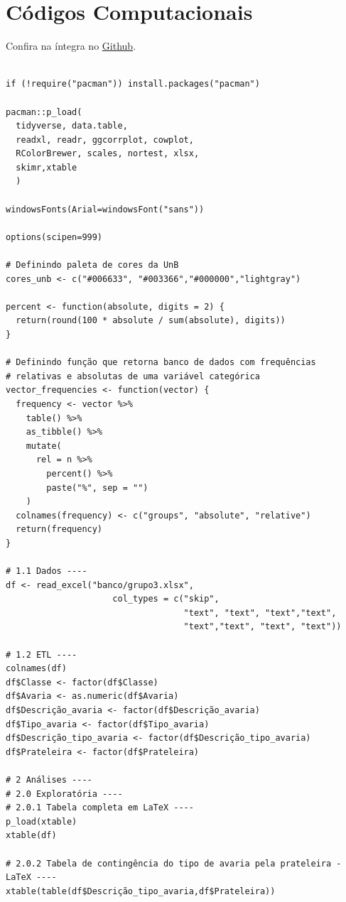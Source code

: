 \documentclass[a4paper, 12pt]{article}
\begin{document}
\newpage

\section{Códigos Computacionais}

Confira na íntegra no \href{https://github.com/penasta/Amostragem/blob/main/scripts/analises.R}{Github}.


\begin{lstlisting}

if (!require("pacman")) install.packages("pacman")

pacman::p_load(
  tidyverse, data.table,
  readxl, readr, ggcorrplot, cowplot,
  RColorBrewer, scales, nortest, xlsx,
  skimr,xtable
  )

windowsFonts(Arial=windowsFont("sans"))

options(scipen=999)

# Definindo paleta de cores da UnB
cores_unb <- c("#006633", "#003366","#000000","lightgray")

percent <- function(absolute, digits = 2) {
  return(round(100 * absolute / sum(absolute), digits))
}

# Definindo função que retorna banco de dados com frequências
# relativas e absolutas de uma variável categórica
vector_frequencies <- function(vector) {
  frequency <- vector %>%
    table() %>%
    as_tibble() %>%
    mutate(
      rel = n %>%
        percent() %>%
        paste("%", sep = "")
    )
  colnames(frequency) <- c("groups", "absolute", "relative")
  return(frequency)
}

# 1.1 Dados ----
df <- read_excel("banco/grupo3.xlsx",
                     col_types = c("skip",
                                   "text", "text", "text","text",
                                   "text","text", "text", "text"))

# 1.2 ETL ----
colnames(df)
df$Classe <- factor(df$Classe)
df$Avaria <- as.numeric(df$Avaria)
df$Descrição_avaria <- factor(df$Descrição_avaria)
df$Tipo_avaria <- factor(df$Tipo_avaria)
df$Descrição_tipo_avaria <- factor(df$Descrição_tipo_avaria)
df$Prateleira <- factor(df$Prateleira)

# 2 Análises ----
# 2.0 Exploratória ----
# 2.0.1 Tabela completa em LaTeX ----
p_load(xtable)
xtable(df)

# 2.0.2 Tabela de contingência do tipo de avaria pela prateleira - LaTeX ----
xtable(table(df$Descrição_tipo_avaria,df$Prateleira))


\end{lstlisting}
\end{document}
